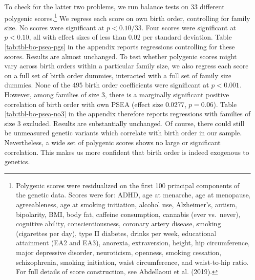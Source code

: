 \documentclass[
]{article}
\theoremstyle{definition}
\theoremstyle{definition}
\theoremstyle{definition}
\theoremstyle{definition}
\theoremstyle{remark}
\begin{document}
To check for the latter two problems, we run balance tests on 33 different
polygenic scores.\footnote{Polygenic scores were residualized on the first 100 principal
  components of the genetic data. Scores were for: ADHD, age at
  menarche, age at menopause, agreeableness, age at smoking
  initiation, alcohol use, Alzheimer's, autism, bipolarity, BMI, body
  fat, caffeine consumption, cannabis (ever vs.~never), cognitive
  ability, conscientiousness, coronary artery disease, smoking
  (cigarettes per day), type II diabetes, drinks per week, educational
  attainment (EA2 and EA3), anorexia, extraversion, height, hip
  circumference, major depressive disorder, neuroticism, openness,
  smoking cessation, schizophrenia, smoking initiation, waist
  circumference, and waist-to-hip ratio. For full details of score
  construction, see Abdellaoui et al. (2019).} We regress each score on own birth order, controlling for
family size. No scores were significant at \(p < 0.10/33\). Four scores were
significant at \(p < 0.10\), all with effect sizes of less than 0.02 per standard
deviation. Table \ref{tab:tbl-bo-psea-pgs} in the appendix reports
regressions controlling for these scores. Results are almost unchanged. To test
whether polygenic scores might vary across birth orders within a particular
family size, we also regress each score on a full set of birth order dummies,
interacted with a full set of family size dummies. None of the
495 birth order coefficients were significant at \(p < 0.001\).
However, among families of size 3, there is a marginally significant positive
correlation of birth order with own PSEA (effect size
0.0277, \(p = 0.06\)). Table
\ref{tab:tbl-bo-psea-no3} in the appendix therefore reports regressions with
families of size 3 excluded. Results are substantially unchanged. Of course,
there could still be unmeasured genetic variants which correlate with birth
order in our sample. Nevertheless, a wide set of polygenic scores shows no large
or significant correlation. This makes us more confident that birth order is
indeed exogenous to genetics.
\end{document}
